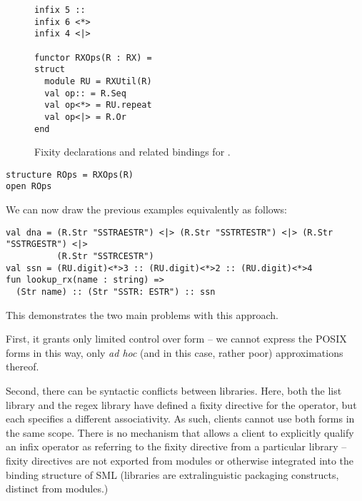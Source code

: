 \begin{figure}
\begin{lstlisting}
infix 5 ::
infix 6 <*>
infix 4 <|>

functor RXOps(R : RX) =
struct 
  module RU = RXUtil(R)
  val op:: = R.Seq
  val op<*> = RU.repeat
  val op<|> = R.Or
end
\end{lstlisting}
\caption{Fixity declarations and related bindings for .}
\label{fig:infix-RX}
\end{figure}
\begin{lstlisting}[numbers=none]
structure ROps = RXOps(R)
open ROps
\end{lstlisting}
We can now draw the previous examples equivalently as follows:
\begin{lstlisting}[numbers=none]
val dna = (R.Str "SSTRAESTR") <|> (R.Str "SSTRTESTR") <|> (R.Str "SSTRGESTR") <|> 
          (R.Str "SSTRCESTR")
val ssn = (RU.digit)<*>3 :: (RU.digit)<*>2 :: (RU.digit)<*>4
fun lookup_rx(name : string) => 
  (Str name) :: (Str "SSTR: ESTR") :: ssn
\end{lstlisting}

This demonstrates the two main problems with this approach. 

First, it grants only limited control over form -- we cannot express the POSIX forms in this way, only \emph{ad hoc} (and in this case, rather poor) approximations thereof. 

Second, there can be syntactic conflicts between libraries. Here, both the list library and the regex library have defined a fixity directive for the \li{::} operator, but each specifies a  different associativity. As such, clients cannot use both forms in the same scope. There is no mechanism that allows a client to explicitly qualify an infix operator as referring to the fixity directive from a particular library -- fixity directives are  not exported from modules or otherwise integrated into the binding structure of SML (libraries are extralinguistic packaging constructs, distinct from modules.) 


